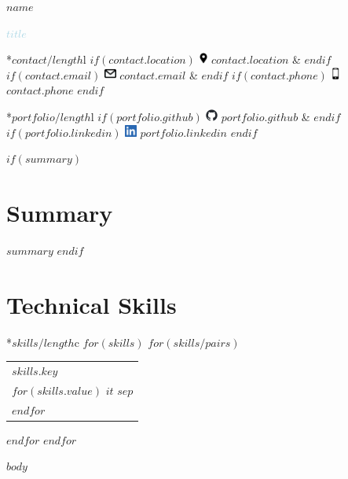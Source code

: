 \documentclass[10pt]{article}
\begin{document}
\begin{center}
{\Huge \textbf{$name$}}

{\Large \textcolor{lightblue}{$title$}}

\begin{tabular}{*{$contact/length$}{l}}
    $if(contact.location)$
        \includegraphics[height=11pt]{logos/location.png} $contact.location$ &
    $endif$
    $if(contact.email)$
        \includegraphics[height=11pt]{logos/mail.png} $contact.email$ &
    $endif$
    $if(contact.phone)$
        \includegraphics[height=11pt]{logos/mobile.png} $contact.phone$
    $endif$
\end{tabular}

\begin{tabular}{*{$portfolio/length$}{l}}
    $if(portfolio.github)$
        \includegraphics[height=11pt]{logos/github-mark.png} $portfolio.github$ &
    $endif$
    $if(portfolio.linkedin)$
        \includegraphics[height=11pt]{logos/LI-In-Bug.png} $portfolio.linkedin$
    $endif$
\end{tabular}
\end{center}

$if(summary)$
\section{Summary}
$summary$
$endif$

\bigskip

\section{Technical Skills}
\begin{tabular}{*{$skills/length$}{c}}
    $for(skills)$
        $for(skills/pairs)$
            \begin{tabular}[t]{l}
                \textbf{$skills.key$}\\
                $for(skills.value)$
                    $it$ $sep$\\
                $endfor$
            \end{tabular}
        $endfor$
    $endfor$
\end{tabular}

$body$
\end{document}
